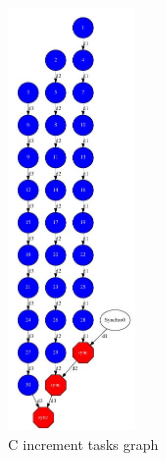\begin{figure}[ht!]
  \centering
    \includegraphics[width=0.3\textwidth]{./Sections/4_C/Figures/increment_graph.jpeg}
    \caption{C increment tasks graph} 
    \label{fig:increment_c}
\end{figure}

\newpage
~
